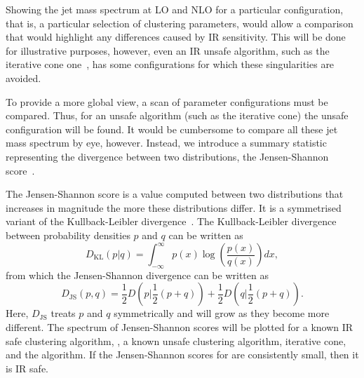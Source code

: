     Showing the jet mass spectrum at LO and NLO for a particular configuration,
    that is, a particular selection of clustering parameters,
    would allow a comparison that would highlight any differences caused by IR sensitivity.
    This will be done for illustrative purposes,
    however, even an IR unsafe algorithm, such as the iterative cone one~\cite{Cacciari:2008gp},
     has some configurations for which these singularities are avoided.

    To provide a more global view, a scan of parameter configurations must be compared.
    Thus, for an unsafe algorithm (such as the iterative cone) the unsafe configuration
    will be found.
    It would be cumbersome to compare all these jet mass spectrum by eye, however.
    Instead, we introduce a summary statistic representing the divergence between two distributions,
    the Jensen-Shannon score~\cite{Lin:1991zzm}.

    The Jensen-Shannon score is a value computed between two distributions that increases in magnitude the more these distributions differ.
    It is a symmetrised variant of the Kullback-Leibler divergence~\cite{Lin:1991zzm}.
    The Kullback-Leibler divergence between probability densities \(p\) and \(q\) can be written as
    \begin{equation}
    D_\text{KL} (p | q) = \int^{\infty}_{-\infty} p(x) \log\left(\frac{p(x)}{q(x)}\right) dx,
\end{equation}
    from which the Jensen-Shannon divergence can be written as
    \begin{equation}
    D_\text{JS}(p, q) = \frac{1}{2}D\left(p | \frac{1}{2}(p + q)\right) + \frac{1}{2}D\left(q | \frac{1}{2}(p + q)\right).
\end{equation}
    Here, \(D_\text{JS}\) treats \(p\) and \(q\) symmetrically and will grow as they become more different.
    The spectrum of Jensen-Shannon scores will be plotted for a known IR safe clustering algorithm, \antikt{},
    a known unsafe clustering algorithm, iterative cone, and the \spectral{} algorithm.
    If the Jensen-Shannon scores for \spectral{} are consistently small,
    then it is IR safe.


